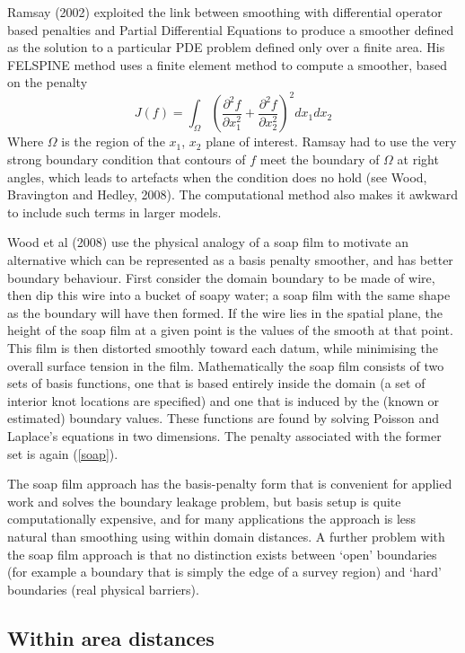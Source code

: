 \documentclass[useAMS, referee]{biom}
\newcommand{\beq}{\begin{equation}}
\newcommand{\eeq}{\end{equation}}
\newcommand{\pdif}[2]{\frac{\partial #1}{\partial #2}}
\begin{document}
Ramsay (2002) exploited the link between smoothing with differential operator based penalties and Partial Differential Equations to produce a smoother defined as the solution to a particular PDE problem defined only over a finite area. His FELSPINE method uses a finite element method to compute a smoother, based on the penalty 
\beq
J(f) = \int_\Omega \left ( \pdif{^2 f}{x_1^2} + \pdif{^2 f}{x_2^2} \right )^2 dx_1 dx_2 
\label{soap}
\eeq 
Where $\Omega$ is the region of the $x_1$, $x_2$ plane of interest. Ramsay had to use the very strong boundary condition that contours of $f$ meet the boundary of $\Omega$ at right angles, which leads to artefacts when the condition does no hold (see Wood, Bravington and Hedley, 2008). The computational method also makes it awkward to include such terms in larger models.

Wood et al (2008) use the physical analogy of a soap film to motivate an alternative which can be represented as a basis penalty smoother, and has better boundary behaviour. First consider the domain boundary to be made of wire, then dip this wire into a bucket of soapy water; a soap film with the same shape as the boundary will have then formed. If the wire lies in the spatial plane, the height of the soap film at a given point is the values of the smooth at that point. This film is then distorted smoothly toward each datum, while minimising the overall surface tension in the film. Mathematically the soap film consists of two sets of basis functions, one that is based entirely inside the domain (a set of interior knot locations are specified) and one that is induced by the (known or estimated) boundary values. These functions are found by solving Poisson and Laplace's equations in two dimensions. The penalty associated with the former set is again (\ref{soap}). 

The soap film approach has the basis-penalty form that is convenient for applied work and solves the boundary leakage problem, but basis setup is quite computationally expensive, and for many applications the approach is less natural than smoothing using within domain distances. A further problem with the soap film approach is that no distinction exists between `open' boundaries (for example a boundary that is simply the edge of a survey region) and `hard' boundaries (real physical barriers).  

\subsection*{Within area distances}
\end{document}
